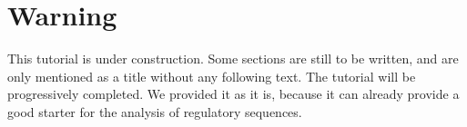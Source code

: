 \section{Warning}

This tutorial is under construction. Some sections are still to be
written, and are only mentioned as a title without any following
text. The tutorial will be progressively completed. We provided it as
it is, because it can already provide a good starter for the analysis
of regulatory sequences.
